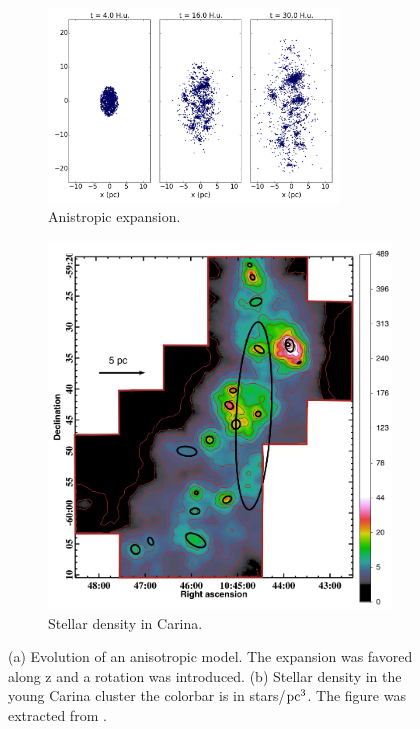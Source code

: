 \begin{figure}
    \centering
    \begin{subfigure}[b]{\textwidth}
        \centering
        \includegraphics[width=0.85\textwidth]{Figures/7_anisotropic.png}
        \caption{Anistropic \HubLem expansion.}
        \label{Fig:7_anistropic}
    \end{subfigure}
    
    \begin{subfigure}[b]{0.6\textwidth}
        \centering
        \includegraphics[width=\textwidth]{Figures/7_carina.png}
        \caption{Stellar density in Carina.}
        \label{Fig:7_carina}
    \end{subfigure}
     \caption{(a) Evolution of an anisotropic \HubLem model. The expansion was favored along z and a rotation was introduced. (b) Stellar density in the young Carina cluster the colorbar is in stars/${\textrm{pc}}^3$. The figure was extracted from \protect\cite{Kuhn2014}.}
     \label{Fig:7_filament}
\end{figure}





